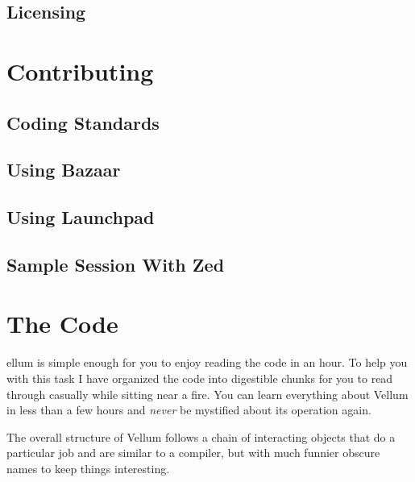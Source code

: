 \section{Licensing}



\chapter{Contributing}
\label{chapter:Contributing}



\section{Coding Standards}


\section{Using Bazaar}


\section{Using Launchpad}


\section{Sample Session With Zed}

\appendix


\chapter{The Code}
\label{appendix:Code}

ellum is simple enough for you to enjoy reading the code in an hour.
To help you with this task I have organized the code into digestible chunks for
you to read through casually while sitting near a fire.  You can learn
everything about Vellum in less than a few hours and \emph{never} be mystified
about its operation again.

The overall structure of Vellum follows a chain of interacting objects that do a
particular job and are similar to a compiler, but with much funnier obscure
names to keep things interesting.

